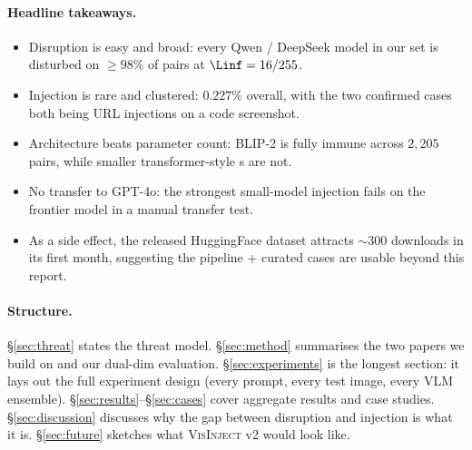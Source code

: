 \paragraph{Headline takeaways.}
\begin{itemize}
  \item Disruption is easy and broad: every Qwen / DeepSeek model in our set is disturbed on $\geq 98\%$ of pairs at $\Linf = 16/255$.
  \item Injection is rare and clustered: $0.227\%$ overall, with the two confirmed cases both being URL injections on a code screenshot.
  \item Architecture beats parameter count: BLIP-2 is fully immune across $2{,}205$ pairs, while smaller transformer-style \vlm{}s are not.
  \item No transfer to GPT-4o: the strongest small-model injection fails on the frontier model in a manual transfer test.
  \item As a side effect, the released HuggingFace dataset attracts $\sim$300 downloads in its first month, suggesting the pipeline + curated cases are usable beyond this report.
\end{itemize}

\paragraph{Structure.}
\S\ref{sec:threat} states the threat model. \S\ref{sec:method} summarises the two papers we build on and our dual-dim evaluation. \S\ref{sec:experiments} is the longest section: it lays out the full experiment design (every prompt, every test image, every VLM ensemble). \S\ref{sec:results}--\S\ref{sec:cases} cover aggregate results and case studies. \S\ref{sec:discussion} discusses why the gap between disruption and injection is what it is. \S\ref{sec:future} sketches what \textsc{VisInject} v2 would look like.
